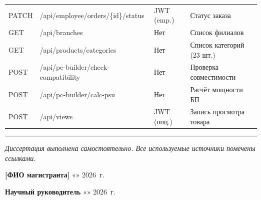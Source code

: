 \documentclass[14pt,a4paper]{extreport}
\begin{document}
\begin{longtable}{llll}
PATCH  & /api/employee/orders/\{id\}/status & JWT (emp.) & Статус заказа \\
GET    & /api/branches                   & Нет         & Список филиалов \\
GET    & /api/products/categories          & Нет         & Список категорий (23 шт.) \\
POST   & /api/pc-builder/check-compatibility & Нет       & Проверка совместимости \\
POST   & /api/pc-builder/calc-psu          & Нет         & Расчёт мощности БП \\
POST   & /api/views                        & JWT (опц.)  & Запись просмотра товара \\
\bottomrule
\end{longtable}

\vfill
\noindent\rule{\textwidth}{0.4pt}
\textit{Диссертация выполнена самостоятельно. Все используемые источники помечены ссылками.}

\vspace{1cm}
\noindent\textbf{[ФИО магистранта]} \hfill \underline{\hspace{5cm}} \quad «\underline{\quad}» \underline{\hspace{2cm}} 2026~г.

\vspace{0.5cm}
\noindent\textbf{Научный руководитель} \hfill \underline{\hspace{5cm}} \quad «\underline{\quad}» \underline{\hspace{2cm}} 2026~г.
\end{document}
